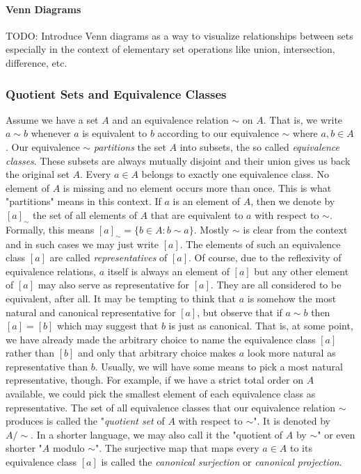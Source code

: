 \paragraph{Venn Diagrams} TODO: Introduce Venn diagrams as a way to visualize relationships between sets especially in the context of elementary set operations like union, intersection, difference, etc.



\subsubsection{Quotient Sets and Equivalence Classes} 
Assume we have a set $A$ and an equivalence relation $\sim$ on $A$. That is, we write $a \sim b$ whenever $a$ is equivalent to $b$ according to our equivalence $\sim$ where $a,b \in A$. Our equivalence $\sim$ \emph{partitions} the set $A$ into subsets, the so called \emph{equivalence classes}. These subsets are always mutually disjoint and their union gives us back the original set $A$. Every $a \in A$ belongs to exactly one equivalence class. No element of $A$ is missing and no element occurs more than once. This is what "partitions" means in this context. If $a$ is an element of $A$, then we denote by $[a]_{\sim}$ the set of all elements of $A$ that are equivalent to $a$ with respect to $\sim$. Formally, this means $[a]_{\sim} = \{ b \in A : b \sim a\}$. Mostly $\sim$ is clear from the context and in such cases we may just write $[a]$. The elements of such an equivalence class $[a]$ are called \emph{representatives} of $[a]$. Of course, due to the reflexivity of equivalence relations, $a$ itself is always an element of $[a]$ but any other element of $[a]$ may also serve as representative for $[a]$. They are all considered to be equivalent, after all. It may be tempting to think that $a$ is somehow the most natural and canonical representative for $[a]$, but observe that if $a \sim b$ then $[a] = [b]$ which may suggest that $b$ is just as canonical. That is, at some point, we have already made the arbitrary choice to name the equivalence class $[a]$ rather than $[b]$ and only that arbitrary choice makes $a$ look more natural as representative than $b$. Usually, we will have some means to pick a most natural representative, though. For example, if we have a strict total order on $A$ available, we could pick the smallest element of each equivalence class as representative. The set of all equivalence classes that our equivalence relation $\sim$ produces is called the "\emph{quotient set} of $A$ with respect to $\sim$". It is denoted by $A / \sim$. In a shorter language, we may also call it the "quotient of $A$ by $\sim$" or even shorter "$A$ modulo $\sim$". The surjective map that maps every $a \in A$ to its equivalence class $[a]$ is called the \emph{canonical surjection} or \emph{canonical projection}.

